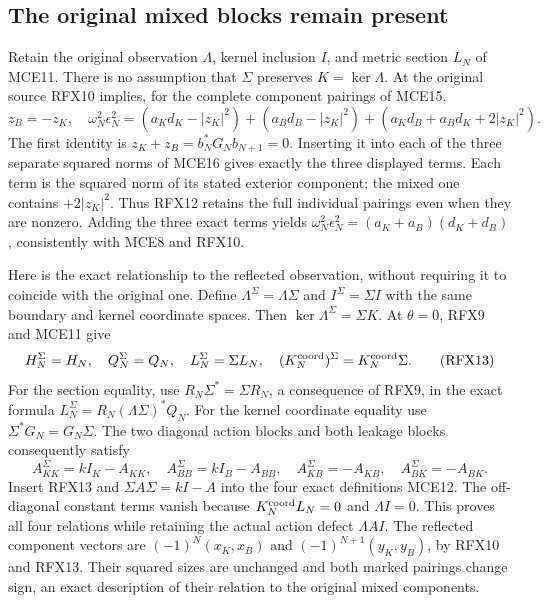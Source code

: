 \documentclass[11pt,a4paper]{article}
\begin{document}
\subsection{The original mixed blocks remain present}
Retain the original observation $\Lambda$, kernel inclusion $I$, and
metric section $L_N$ of MCE11. There is no assumption that $\Sigma$
preserves $K=\ker\Lambda$. At the original source RFX10 implies,
for the complete component pairings of MCE15,
\[
 z_B=-z_K,
 \quad \omega_N^2\epsilon_N^2
   =(a_Kd_K-|z_K|^2)+(a_Bd_B-|z_K|^2)
                  +(a_Kd_B+a_Bd_K+2|z_K|^2).
 \tag{RFX12}
\]
The first identity is $z_K+z_B=b_N^*G_Nb_{N+1}=0$.
Inserting it into each of the three separate squared norms of MCE16
gives exactly the three displayed terms. Each term is the squared
norm of its stated exterior component; the mixed one contains
$+2|z_K|^2$. Thus RFX12 retains the full individual pairings even
when they are nonzero. Adding the three exact terms yields
$\omega_N^2\epsilon_N^2=(a_K+a_B)(d_K+d_B)$, consistently with
MCE8 and RFX10.

Here is the exact relationship to the reflected observation, without
requiring it to coincide with the original one. Define
$\Lambda^\Sigma=\Lambda\Sigma$ and $I^\Sigma=\Sigma I$ with the
same boundary and kernel coordinate spaces. Then
$\ker\Lambda^\Sigma=\Sigma K$. At $\theta=0$, RFX9 and MCE11 give
\[
 H_N^\Sigma=H_N,\quad Q_N^\Sigma=Q_N,\quad L_N^\Sigma=\Sigma L_N,
 \quad (K_N^{\rm coord})^\Sigma=K_N^{\rm coord}\Sigma.
 \tag{RFX13}
\]
For the section equality, use
$R_N\Sigma^*=\Sigma R_N$, a consequence of RFX9, in the exact
formula $L_N^\Sigma=R_N(\Lambda\Sigma)^*Q_N$.
For the kernel coordinate equality use
$\Sigma^*G_N=G_N\Sigma$. The two diagonal action blocks and both
leakage blocks consequently satisfy
\[
 A_{KK}^\Sigma=kI_K-A_{KK},\quad
 A_{BB}^\Sigma=kI_B-A_{BB},\quad
 A_{KB}^\Sigma=-A_{KB},\quad A_{BK}^\Sigma=-A_{BK}.
 \tag{RFX14}
\]
Insert RFX13 and $\Sigma A\Sigma=kI-A$ into the four exact
definitions MCE12. The off-diagonal constant terms vanish because
$K_N^{\rm coord}L_N=0$ and $\Lambda I=0$. This proves all four
relations while retaining the actual action defect $\Lambda AI$.
The reflected component vectors are $(-1)^N(x_K,x_B)$ and
$(-1)^{N+1}(y_K,y_B)$, by RFX10 and RFX13. Their squared sizes
are unchanged and both marked pairings change sign, an exact
description of their relation to the original mixed components.
\end{document}
